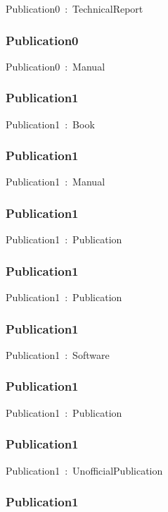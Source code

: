 \documentclass{article}
\begin{document}
Publication0~:~TechnicalReport

\subsubsection*{Publication0}

Publication0~:~Manual

\subsubsection*{Publication1}

Publication1~:~Book

\subsubsection*{Publication1}

Publication1~:~Manual

\subsubsection*{Publication1}

Publication1~:~Publication

\subsubsection*{Publication1}

Publication1~:~Publication

\subsubsection*{Publication1}

Publication1~:~Software

\subsubsection*{Publication1}

Publication1~:~Publication

\subsubsection*{Publication1}

Publication1~:~UnofficialPublication

\subsubsection*{Publication1}
\end{document}
